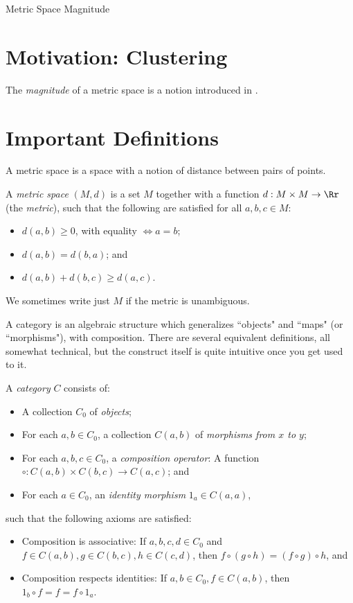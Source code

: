 \documentclass[12pt]{pom_thesis}
\begin{document}
\begin{chapter}{Metric Space Magnitude}
\section{Motivation: Clustering}
The \emph{magnitude} of a metric space is a notion introduced in \cite{Lein2}. %
\section{Important Definitions}
A metric space is a space with a notion of distance between pairs of points. 
\begin{defn}
A \textit{metric space} $(M,d)$ is a set $M$ together with a function  $d:M \times M \rightarrow \Rr$ (the \emph{metric}), such that the following are satisfied for all $a,b,c \in M$:
\begin{itemize}
\item $d(a,b) \geq 0$, with equality $\iff a = b$;
\item $d(a,b) = d(b,a)$; and
\item $d(a,b) + d(b,c) \geq d(a,c)$.
\end{itemize}
We sometimes write just $M$ if the metric is unambiguous.
\end{defn}
A category is an algebraic structure which generalizes ``objects" and ``maps" (or ``morphisms"), with composition. There are several equivalent definitions, all somewhat technical, but the construct itself is quite intuitive once you get used to it.  
\begin{defn}
A \textit{category} $C$ consists of:
\begin{itemize}
\item A collection $C_0$ of \emph{objects};
\item For each $a,b \in C_0$, a collection $C(a,b)$ of \emph{morphisms from $x$ to $y$};
\item For each $a,b,c \in C_0$, a \emph{composition operator}: A function $\circ:C(a,b) \times C(b,c) \rightarrow C(a,c)$; and
\item For each $a \in C_0$, an \emph{identity morphism} $1_a \in C(a,a)$,
\end{itemize}
such that the following axioms are satisfied:
\begin{itemize}
\item Composition is associative: If $a,b,c,d \in C_0$ and $f\in C(a,b), g \in C(b,c), h \in C(c,d)$, then $f \circ (g \circ h) = (f \circ g) \circ h$, and
\item Composition respects identities: If $a,b \in C_0, f \in C(a,b)$, then $1_b \circ f = f = f \circ 1_a$.
\end{itemize}


\end{defn}
\end{chapter}
\end{document}
